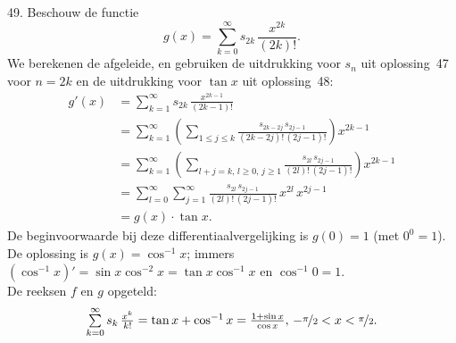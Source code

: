 \begin{problem}{49.}
	Beschouw de functie
	\begin{equation*}
		g(x) = \textstyle\sum\limits_{k=0}^{\infty} s_{2k}\, \frac{x^{2k}}{(2k)!}.
	\end{equation*}
    We berekenen de afgeleide, en gebruiken de uitdrukking voor $s_n$ uit oplossing~47 voor $n = 2k$ en de uitdrukking voor $\tan x$ uit oplossing~48:
    \begin{equation*}
    \begin{split}
        g'(x) & = \textstyle\sum\limits_{k=1}^{\infty} s_{2k}\, \frac{x^{2k - 1}}{(2k - 1)!} \\
              & = \textstyle\sum\limits_{k=1}^{\infty} \left( \textstyle\sum\limits_{1 \leq j \leq k} \frac{s_{2k - 2j}\, s_{2j - 1}}{(2k - 2j)!\, (2j - 1)!} \right) x^{2k - 1} \\
              & = \textstyle\sum\limits_{k=1}^{\infty} \left( \textstyle\sum\limits_{l+j=k,\, l \geq 0,\, j\geq 1} \frac{s_{2l}\, s_{2j - 1}}{(2l)!\, (2j - 1)!} \right) x^{2k - 1} \\
              & = \textstyle\sum\limits_{l=0}^{\infty} \textstyle\sum\limits_{j=1}^{\infty} \frac{s_{2l}\, s_{2j - 1}}{(2l)!\, (2j - 1)!} \, x^{2l}\, x^{2j - 1} \\
              & = g(x) \cdot \tan x.
    \end{split}
	\end{equation*}
    De beginvoorwaarde bij deze differentiaalvergelijking is $g(0) = 1$ (met $0^0 = 1$).\\
    De oplossing is $g(x) = \cos^{-1} x$; immers $(\cos^{-1} x)' = \sin x \cos^{-2} x = \tan x \cos^{-1} x$ en $\cos^{-1} 0 = 1$.\\

    De reeksen $f$ en $g$ opgeteld:
    \begin{equation*}
		\textstyle\sum\limits_{k=0}^{\infty} s_{k}\, \frac{x^k}{k!} = \tan x + \cos^{-1} x = \frac{1 + \sin x}{\cos x},\, -\nicefrac{\pi}{2} < x < \nicefrac{\pi}{2}.
	\end{equation*}
\end{problem}

\clearpage

